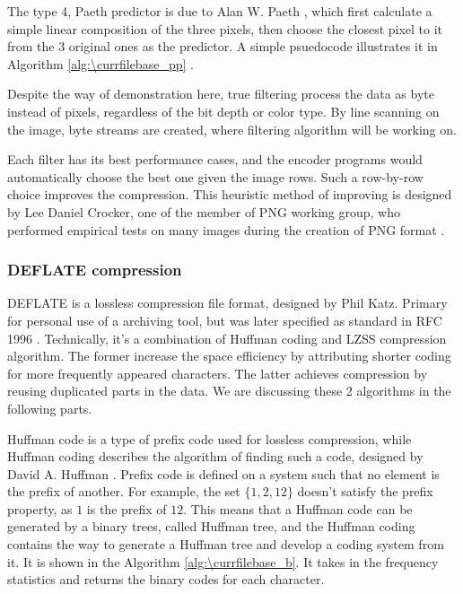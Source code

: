 \documentclass[catalog.tex]{subfiles}
\begin{document}
The type 4, Paeth predictor is due to Alan W. Paeth \cite{1991Image}, which first calculate a simple linear composition of the three pixels, then choose the closest pixel to it from the 3 original ones as the predictor. A simple psuedocode illustrates it in Algorithm \ref{alg:\currfilebase_pp} \cite{W3CPNG}.

\begin{Algorithm}
\end{Algorithm}

Despite the way of demonstration here, true filtering process the data as byte instead of pixels, regardless of the bit depth or color type. By line scanning on the image, byte streams are created, where filtering algorithm will be working on.

Each filter has its best performance cases, and the encoder programs would automatically choose the best one given the image rows. Such a row-by-row choice improves the compression. This heuristic method of improving is designed by Lee Daniel Crocker, one of the member of PNG working group, who performed empirical tests on many images during the creation of PNG format \cite{crocker1995png}. 

\subsubsection*{DEFLATE compression}

DEFLATE is a lossless compression file format, designed by Phil Katz. Primary for personal use of a archiving tool, but was later specified as standard in RFC 1996 \cite{deutsch1996rfc1951}. Technically, it's a combination of Huffman coding and LZSS compression algorithm. The former increase the space efficiency by attributing shorter coding for more frequently appeared characters. The latter achieves compression by reusing duplicated parts in the data. We are discussing these 2 algorithms in the following parts.

Huffman code is a type of prefix code used for lossless compression, while Huffman coding describes the algorithm of finding such a code, designed by David A. Huffman \cite{huffman1952method}. Prefix code is defined on a system such that no element is the prefix of another. For example, the set $\{1,2,12\}$ doesn't satisfy the prefix property, as $1$ is the prefix of $12$. This means that a Huffman code can be generated by a binary trees, called Huffman tree, and the Huffman coding contains the way to generate a Huffman tree and develop a coding system from it. It is shown in the Algorithm \ref{alg:\currfilebase_b}. It takes in the frequency statistics and returns the binary codes for each character.
\end{document}
